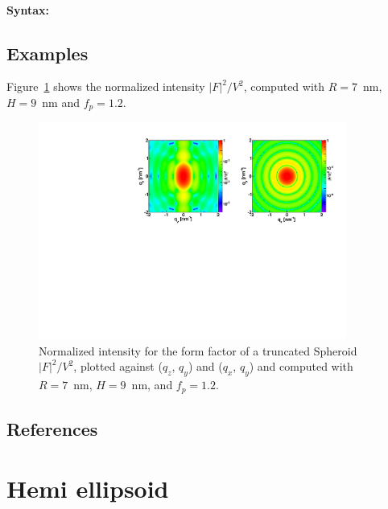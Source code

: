 \paragraph{Syntax:} 

\subsection{Examples}
Figure~\ref{figFFspheroidEx} shows the normalized intensity
$|F|^2/V^2$, computed with $R=7$~nm, $H=9$~nm and $f_p=1.2$.

\begin{figure}[h]
\begin{center}
\includegraphics[width=0.9\textwidth]{Figures/figffspheroid}
\end{center}
\caption{Normalized intensity for the form factor of a truncated Spheroid
  $|F|^2/V^2$, plotted against ($q_z$, $q_y$) and ($q_x$, $q_y$) and
  computed with $R=7$~nm, $H=9$~nm, and $f_p=1.2$.}
\label{figFFspheroidEx}
\end{figure}
\FloatBarrier


\subsection{References}

\newpage{\cleardoublepage}
\section{Hemi ellipsoid}   

